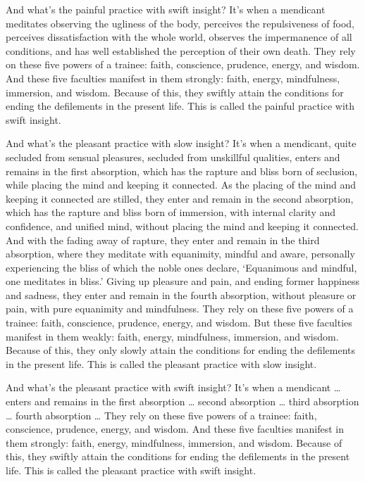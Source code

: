 \documentclass[12pt,openany]{book}%
\begin{document}
And what’s the painful practice with swift insight? It’s when a mendicant meditates observing the ugliness of the body, perceives the repulsiveness of food, perceives dissatisfaction with the whole world, observes the impermanence of all conditions, and has well established the perception of their own death. They rely on these five powers of a trainee: faith, conscience, prudence, energy, and wisdom. And these five faculties manifest in them strongly: faith, energy, mindfulness, immersion, and wisdom. Because of this, they swiftly attain the conditions for ending the defilements in the present life. This is called the painful practice with swift insight. 

And what’s the pleasant practice with slow insight? It’s when a mendicant, quite secluded from sensual pleasures, secluded from unskillful qualities, enters and remains in the first absorption, which has the rapture and bliss born of seclusion, while placing the mind and keeping it connected. As the placing of the mind and keeping it connected are stilled, they enter and remain in the second absorption, which has the rapture and bliss born of immersion, with internal clarity and confidence, and unified mind, without placing the mind and keeping it connected. And with the fading away of rapture, they enter and remain in the third absorption, where they meditate with equanimity, mindful and aware, personally experiencing the bliss of which the noble ones declare, ‘Equanimous and mindful, one meditates in bliss.’ Giving up pleasure and pain, and ending former happiness and sadness, they enter and remain in the fourth absorption, without pleasure or pain, with pure equanimity and mindfulness. They rely on these five powers of a trainee: faith, conscience, prudence, energy, and wisdom. But these five faculties manifest in them weakly: faith, energy, mindfulness, immersion, and wisdom. Because of this, they only slowly attain the conditions for ending the defilements in the present life. This is called the pleasant practice with slow insight. 

And what’s the pleasant practice with swift insight? It’s when a mendicant … enters and remains in the first absorption … second absorption … third absorption … fourth absorption … They rely on these five powers of a trainee: faith, conscience, prudence, energy, and wisdom. And these five faculties manifest in them strongly: faith, energy, mindfulness, immersion, and wisdom. Because of this, they swiftly attain the conditions for ending the defilements in the present life. This is called the pleasant practice with swift insight. 
\end{document}
